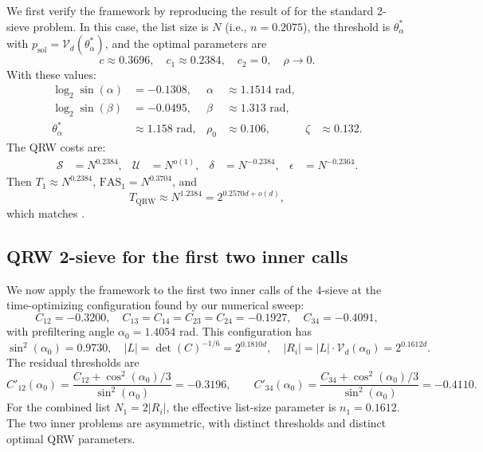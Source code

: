 \documentclass[10pt,a4paper]{article}
\begin{document}
We first verify the framework by reproducing the result of \cite[Theorem~1]{CL21} for the standard 2-sieve problem. In this case, the list size is \(N\) (i.e., \(n = 0.2075\)), the threshold is \(\theta_\alpha^*\) with \(p_{\mathrm{sol}} = \mathcal{V}_d(\theta_\alpha^*)\), and the optimal parameters are
\begin{equation}
c \approx 0.3696, \quad c_1 \approx 0.2384, \quad c_2 = 0, \quad \rho \to 0.
\end{equation}
With these values:
\begin{align}
\log_2 \sin(\alpha) &= -0.1308, & \alpha &\approx 1.1514 \text{ rad}, \\
\log_2 \sin(\beta) &= -0.0495, & \beta &\approx 1.313 \text{ rad}, \\
\theta_\alpha^* &\approx 1.158 \text{ rad}, & \rho_0 &\approx 0.106, & \zeta &\approx 0.132.
\end{align}
The QRW costs are:
\begin{align}
\mathcal{S} &= N^{0.2384}, & \mathcal{U} &= N^{o(1)}, & \delta &= N^{-0.2384}, & \epsilon &= N^{-0.2364}.
\end{align}
Then \(T_1 \approx N^{0.2384}\), \(\mathrm{FAS}_1 = N^{0.3704}\), and
\begin{equation}
T_{\mathrm{QRW}} \approx N^{1.2384} = 2^{0.2570d+o(d)},
\end{equation}
which matches \cite[Theorem~1]{CL21}.

\subsection{QRW 2-sieve for the first two inner calls}
\label{sec_QRW_first2}

We now apply the framework to the first two inner calls of the 4-sieve at the time-optimizing configuration found by our numerical sweep:
\[
C_{12} = -0.3200,\quad C_{13}=C_{14}=C_{23}=C_{24} = -0.1927,\quad C_{34} = -0.4091,
\]
with prefiltering angle \(\alpha_0 = 1.4054\) rad. This configuration has
\[
\sin^2(\alpha_0) = 0.9730,\quad
|L| = \det(C)^{-1/6} = 2^{0.1810d},\quad
|R_i| = |L|\cdot\mathcal{V}_d(\alpha_0) = 2^{0.1612d}.
\]
The residual thresholds are
\begin{equation}
C'_{12}(\alpha_0) = \frac{C_{12} + \cos^2(\alpha_0)/3}{\sin^2(\alpha_0)} = -0.3196,
\qquad
C'_{34}(\alpha_0) = \frac{C_{34} + \cos^2(\alpha_0)/3}{\sin^2(\alpha_0)} = -0.4110.
\end{equation}
For the combined list \(N_1 = 2|R_i|\), the effective list-size parameter is \(n_1 = 0.1612\). The two inner problems are asymmetric, with distinct thresholds and distinct optimal QRW parameters.
\end{document}
